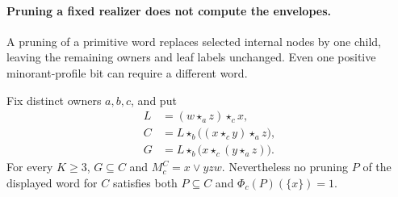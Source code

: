 \paragraph{Pruning a fixed realizer does not compute the envelopes.}
A pruning of a primitive word replaces selected internal nodes by one
child, leaving the remaining owners and leaf labels unchanged.
Even one positive minorant-profile bit can require a different word.

\begin{proposition}
\label{core:prop:minorant-pruning-obstruction}
Fix distinct owners $a,b,c$, and put
\[
 \begin{aligned}
 L&=(w\star_a z)\star_c x,\\
 C&=L\star_b\bigl((x\star_c y)\star_a z\bigr),\\
 G&=L\star_b\bigl(x\star_c(y\star_a z)\bigr).
 \end{aligned}
\]
For every $K\geq3$, $G\subseteq C$ and $M_c^C=x\lor yzw$.
Nevertheless no pruning $P$ of the displayed word for $C$ satisfies
both $P\subseteq C$ and $\Phi_c(P)(\{x\})=1$.
\end{proposition}
